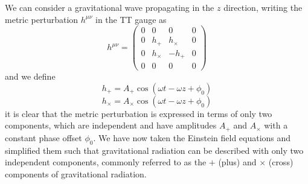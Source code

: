We can consider a gravitational wave propagating in the $z$ direction, writing the metric perturbation $h^{\mu\nu}$ in the TT gauge as
%
\begin{equation}
   h^{\mu \nu} =
   \begin{pmatrix}
      0 & 0 & 0 & 0 \\
      0 & h_+ & h_\times & 0 \\
      0 & h_\times & -h_+ & 0 \\
      0 & 0 & 0 & 0
   \end{pmatrix}
   \label{eqn:h_TT}
\end{equation}
%
and we define
%
\begin{equation}
    h_+ = A_+ \cos(\omega t - \omega z + \phi_{0})
\end{equation}
\begin{equation}
    h_{\times} = A_{\times} \cos(\omega t - \omega z + \phi_{0})
\end{equation}
%
it is clear that the metric perturbation is expressed in terms of only two components, which are independent and have amplitudes $A_{+}$ and $A_{\times}$ with a constant phase offset $\phi_{0}$. We have now taken the Einstein field equations and simplified them such that gravitational radiation can be described with only two independent components, commonly referred to as the $+$ (plus) and $\times$ (cross) components of gravitational radiation.

